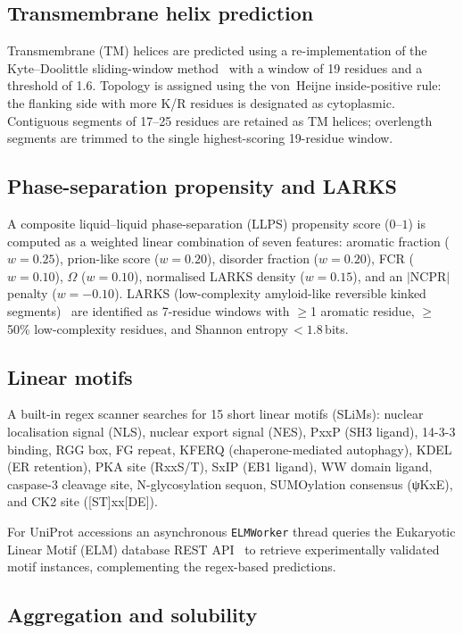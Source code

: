 \documentclass[12pt]{article}
\begin{document}
\subsection{Transmembrane helix prediction}

Transmembrane (TM) helices are predicted using a re-implementation of the
Kyte--Doolittle sliding-window method~\citep{kyte1982} with a window of
19 residues and a threshold of 1.6.
Topology is assigned using the von~Heijne inside-positive rule: the
flanking side with more K/R residues is designated as cytoplasmic.
Contiguous segments of 17--25 residues are retained as TM helices; overlength
segments are trimmed to the single highest-scoring 19-residue window.

\subsection{Phase-separation propensity and LARKS}

A composite liquid--liquid phase-separation (LLPS) propensity score
($0$--$1$) is computed as a weighted linear combination of seven features:
aromatic fraction ($w = 0.25$), prion-like score ($w = 0.20$), disorder
fraction ($w = 0.20$), FCR ($w = 0.10$), $\Omega$ ($w = 0.10$),
normalised LARKS density ($w = 0.15$), and an $|\mathrm{NCPR}|$ penalty
($w = -0.10$).
LARKS (low-complexity amyloid-like reversible kinked segments)~\citep{hughes2018}
are identified as 7-residue windows with $\geq$1 aromatic residue, $\geq$50\%
low-complexity residues, and Shannon entropy\,$< 1.8$\,bits.

\subsection{Linear motifs}

A built-in regex scanner searches for 15 short linear motifs (SLiMs):
nuclear localisation signal (NLS), nuclear export signal (NES), PxxP
(SH3 ligand), 14-3-3 binding, RGG box, FG repeat, KFERQ (chaperone-mediated
autophagy), KDEL (ER retention), PKA site (RxxS/T), SxIP (EB1 ligand), WW
domain ligand, caspase-3 cleavage site, N-glycosylation sequon, SUMOylation
consensus (ψKxE), and CK2 site ([ST]xx[DE]).

For UniProt accessions an asynchronous \texttt{ELMWorker} thread queries
the Eukaryotic Linear Motif (ELM) database REST API~\citep{kumar2020} to
retrieve experimentally validated motif instances, complementing the
regex-based predictions.

\subsection{Aggregation and solubility}
\end{document}
